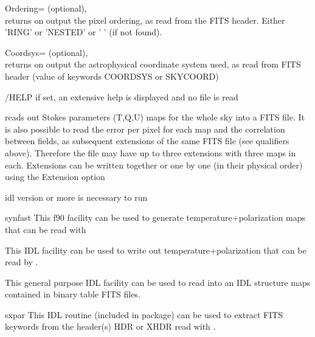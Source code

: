 \begin{qualifiers}
\begin{qulist}{}
	 \item[{Ordering=}] 
	        (optional), \\
	        returns on output the pixel ordering, as read from the FITS
	        header. Either 'RING' or 'NESTED' or ' ' (if not found).

	 \item[{Coordsys=}] 
	        (optional), \\
	        returns on output the astrophysical coordinate system used, 
		as read from FITS header (value of keywords COORDSYS or SKYCOORD)

  \end{qulist}
\end{qualifiers}

\begin{keywords}
  \begin{kwlist}{} %
	\item[{/HELP}]   if set, an extensive help is displayed and no
	file is read
   \end{kwlist}
\end{keywords}

\begin{codedescription}
{\thedocid{} reads out Stokes parameters (T,Q,U) maps for the whole
sky into a FITS file. It is also possible to read the error per pixel for each
map and the correlation between fields, as subsequent extensions of the same FITS
file (see qualifiers above). Therefore the file may have up to three extensions with three
maps in each. Extensions can be written together or one by one (in
their physical order) using the Extension option}
\end{codedescription}



\begin{related}
  \begin{sulist}{} %
  \item[idl] version \idlversion or more is necessary to run \thedocid
  \item[synfast] This \healpix f90 facility can be used to generate
  temperature+polarization maps that can be read with \thedocid
  \item[\htmlref{write\_tqu}{idl:write_tqu}] This \healpix IDL facility can be used to write
  out temperature+polarization that can be read by \thedocid.

  \item[\htmlref{read\_fits\_s}{idl:read_fits_s}] This general purpose \healpix IDL facility can be used to read
  into an IDL structure maps contained in binary table FITS files.
  \item[sxpar] This IDL routine (included in \healpix package) can be
  used to extract FITS keywords from the header(s) HDR or XHDR read with \thedocid.
  \end{sulist}
\end{related}


